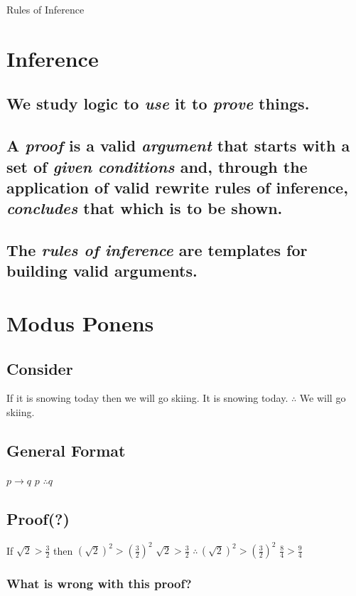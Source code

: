 \documentclass[11pt]{article}
\author{Brian C. Ladd}
\date{\today}
\title{}
\begin{document}
\tableofcontents

Rules of Inference

\section{Inference}
\label{sec:orga78c5ea}
\subsection{We study logic to \emph{use} it to \emph{prove} things.}
\label{sec:org2f93906}
\subsection{A \emph{proof} is a valid \emph{argument} that starts with a set of \emph{given conditions} and, through the application of valid rewrite rules of inference, \emph{concludes} that which is to be shown.}
\label{sec:orgd8d0fb3}
\subsection{The \emph{rules of inference} are templates for building valid arguments.}
\label{sec:org6677c6b}

\section{Modus Ponens}
\label{sec:orgf133a33}
\subsection{Consider}
\label{sec:org52db3e4}
If it is snowing today then we will go skiing.
It is snowing today.
\(\therefore\) We will go skiing.

\subsection{General Format}
\label{sec:orga4dd7c9}
\(p \rightarrow q\)
\(p\)
\(\therefore q\)

\subsection{Proof(?)}
\label{sec:org4bc84a0}
If \(\sqrt{2} > \frac{3}{2}\) then \((\sqrt{2})^2 > (\frac{3}{2})^2\)
\(\sqrt{2} > \frac{3}{2}\)
\(\therefore \, (\sqrt{2})^2 > (\frac{3}{2})^2\)
\(\frac{8}{4} > \frac{9}{4}\)
\subsubsection{What is wrong with this proof?}
\label{sec:org6ce3ada}
\end{document}
